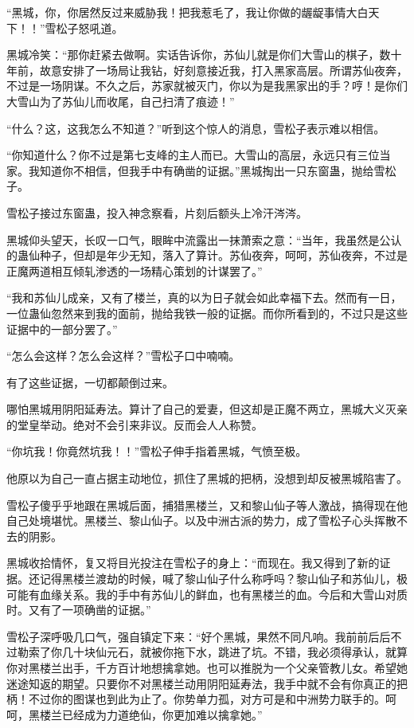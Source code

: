 
\begin{this_body}

“黑城，你，你居然反过来威胁我！把我惹毛了，我让你做的龌龊事情大白天下！！”雪松子怒吼道。

黑城冷笑：“那你赶紧去做啊。实话告诉你，苏仙儿就是你们大雪山的棋子，数十年前，故意安排了一场局让我钻，好刻意接近我，打入黑家高层。所谓苏仙夜奔，不过是一场阴谋。不久之后，苏家就被灭门，你以为是我黑家出的手？哼！是你们大雪山为了苏仙儿而收尾，自己扫清了痕迹！”

“什么？这，这我怎么不知道？”听到这个惊人的消息，雪松子表示难以相信。

“你知道什么？你不过是第七支峰的主人而已。大雪山的高层，永远只有三位当家。我知道你不相信，但我手中有确凿的证据。”黑城掏出一只东窗蛊，抛给雪松子。

雪松子接过东窗蛊，投入神念察看，片刻后额头上冷汗涔涔。

黑城仰头望天，长叹一口气，眼眸中流露出一抹萧索之意：“当年，我虽然是公认的蛊仙种子，但却是年少无知，落入了算计。苏仙夜奔，呵呵，苏仙夜奔，不过是正魔两道相互倾轧渗透的一场精心策划的计谋罢了。”

“我和苏仙儿成亲，又有了楼兰，真的以为日子就会如此幸福下去。然而有一日，一位蛊仙忽然来到我的面前，抛给我铁一般的证据。而你所看到的，不过只是这些证据中的一部分罢了。”

“怎么会这样？怎么会这样？”雪松子口中喃喃。

有了这些证据，一切都颠倒过来。

哪怕黑城用阴阳延寿法。算计了自己的爱妻，但这却是正魔不两立，黑城大义灭亲的堂皇举动。绝对不会引来非议。反而会人人称赞。

“你坑我！你竟然坑我！！”雪松子伸手指着黑城，气愤至极。

他原以为自己一直占据主动地位，抓住了黑城的把柄，没想到却反被黑城陷害了。

雪松子傻乎乎地跟在黑城后面，捕猎黑楼兰，又和黎山仙子等人激战，搞得现在他自己处境堪忧。黑楼兰、黎山仙子。以及中洲古派的势力，成了雪松子心头挥散不去的阴影。

黑城收拾情怀，复又将目光投注在雪松子的身上：“而现在。我又得到了新的证据。还记得黑楼兰渡劫的时候，喊了黎山仙子什么称呼吗？黎山仙子和苏仙儿，极可能有血缘关系。我的手中有苏仙儿的鲜血，也有黑楼兰的血。今后和大雪山对质时。又有了一项确凿的证据。”

雪松子深呼吸几口气，强自镇定下来：“好个黑城，果然不同凡响。我前前后后不过勒索了你几十块仙元石，就被你拖下水，跳进了坑。不错，我必须得承认，就算你对黑楼兰出手，千方百计地想擒拿她。也可以推脱为一个父亲管教儿女。希望她迷途知返的期望。只要你不对黑楼兰动用阴阳延寿法，我手中就不会有你真正的把柄！不过你的图谋也到此为止了。你势单力孤，对方可是和中洲势力联手的。呵呵，黑楼兰已经成为力道绝仙，你更加难以擒拿她。”


\end{this_body}
